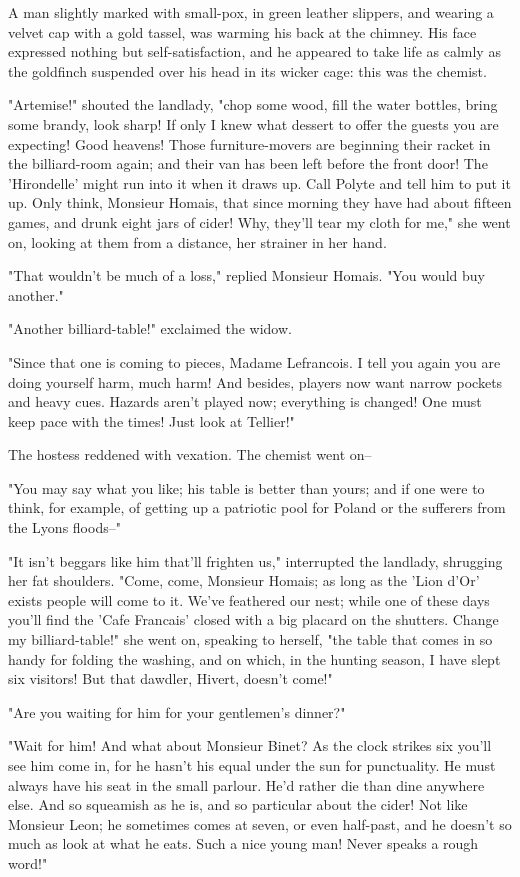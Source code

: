 \documentclass[11pt,twocolumn]{ltugboat}
\begin{document}
A man slightly marked with small-pox, in green leather slippers, and
wearing a velvet cap with a gold tassel, was warming his back at the
chimney. His face expressed nothing but self-satisfaction, and he
appeared to take life as calmly as the goldfinch suspended over his head
in its wicker cage: this was the chemist.

"Artemise!" shouted the landlady, "chop some wood, fill the water
bottles, bring some brandy, look sharp! If only I knew what dessert to
offer the guests you are expecting! Good heavens! Those furniture-movers
are beginning their racket in the billiard-room again; and their van has
been left before the front door! The 'Hirondelle' might run into it when
it draws up. Call Polyte and tell him to put it up. Only think, Monsieur
Homais, that since morning they have had about fifteen games, and drunk
eight jars of cider! Why, they'll tear my cloth for me," she went on,
looking at them from a distance, her strainer in her hand.

"That wouldn't be much of a loss," replied Monsieur Homais. "You would
buy another."

"Another billiard-table!" exclaimed the widow.

"Since that one is coming to pieces, Madame Lefrancois. I tell you again
you are doing yourself harm, much harm! And besides, players now want
narrow pockets and heavy cues. Hazards aren't played now; everything is
changed! One must keep pace with the times! Just look at Tellier!"

The hostess reddened with vexation. The chemist went on--

"You may say what you like; his table is better than yours; and if one
were to think, for example, of getting up a patriotic pool for Poland or
the sufferers from the Lyons floods--"

"It isn't beggars like him that'll frighten us," interrupted the
landlady, shrugging her fat shoulders. "Come, come, Monsieur Homais; as
long as the 'Lion d'Or' exists people will come to it. We've feathered
our nest; while one of these days you'll find the 'Cafe Francais' closed
with a big placard on the shutters. Change my billiard-table!" she went
on, speaking to herself, "the table that comes in so handy for folding
the washing, and on which, in the hunting season, I have slept six
visitors! But that dawdler, Hivert, doesn't come!"

"Are you waiting for him for your gentlemen's dinner?"

"Wait for him! And what about Monsieur Binet? As the clock strikes
six you'll see him come in, for he hasn't his equal under the sun for
punctuality. He must always have his seat in the small parlour. He'd
rather die than dine anywhere else. And so squeamish as he is, and so
particular about the cider! Not like Monsieur Leon; he sometimes comes
at seven, or even half-past, and he doesn't so much as look at what he
eats. Such a nice young man! Never speaks a rough word!"
\end{document}
